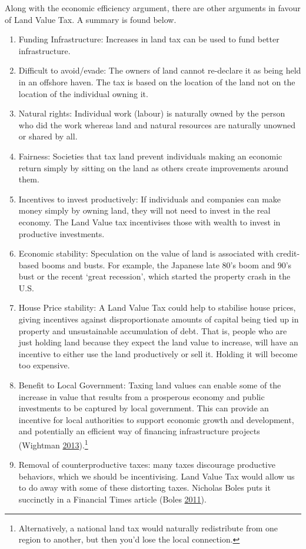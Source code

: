 \documentclass[]{tufte-handout}
\providecommand{\tightlist}{%
  \setlength{\itemsep}{0pt}\setlength{\parskip}{0pt}}
\begin{document}
Along with the economic efficiency argument, there are other arguments
in favour of Land Value Tax. A summary is found below.

\begin{enumerate}
\def\labelenumi{\arabic{enumi}.}
\tightlist
\item
  Funding Infrastructure: Increases in land tax can be used to fund
  better infrastructure.
\item
  Difficult to avoid/evade: The owners of land cannot re-declare it as
  being held in an offshore haven. The tax is based on the location of
  the land not on the location of the individual owning it.
\item
  Natural rights: Individual work (labour) is naturally owned by the
  person who did the work whereas land and natural resources are
  naturally unowned or shared by all.
\item
  Fairness: Societies that tax land prevent individuals making an
  economic return simply by sitting on the land as others create
  improvements around them.
\item
  Incentives to invest productively: If individuals and companies can
  make money simply by owning land, they will not need to invest in the
  real economy. The Land Value tax incentivises those with wealth to
  invest in productive investments.
\item
  Economic stability: Speculation on the value of land is associated
  with credit-based booms and busts. For example, the Japanese late 80's
  boom and 90's bust or the recent `great recession', which started the
  property crash in the U.S.
\item
  House Price stability: A Land Value Tax could help to stabilise house
  prices, giving incentives against disproportionate amounts of capital
  being tied up in property and unsustainable accumulation of debt. That
  is, people who are just holding land because they expect the land
  value to increase, will have an incentive to either use the land
  productively or sell it. Holding it will become too expensive.
\item
  Benefit to Local Government: Taxing land values can enable some of the
  increase in value that results from a prosperous economy and public
  investments to be captured by local government. This can provide an
  incentive for local authorities to support economic growth and
  development, and potentially an efficient way of financing
  infrastructure projects (Wightman
  \protect\hyperlink{ref-Wightman2013}{2013}).\footnote{Alternatively, a
    national land tax would naturally redistribute from one region to
    another, but then you'd lose the local connection.}
\item
  Removal of counterproductive taxes: many taxes discourage productive
  behaviors, which we should be incentivising. Land Value Tax would
  allow us to do away with some of these distorting taxes. Nicholas
  Boles puts it succinctly in a Financial Times article (Boles
  \protect\hyperlink{ref-Boles}{2011}).
\end{enumerate}
\end{document}
